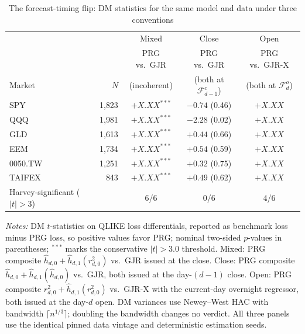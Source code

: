 \documentclass[11pt,a4paper]{article}
\begin{document}
\begin{table}[htbp]
\centering
\caption{The forecast-timing flip: DM statistics for the same model and data under three conventions}
\label{tab:flip}
\small
\begin{tabular}{lrccc}
\toprule
 & & Mixed & Close & Open \\
 & & PRG vs.\ GJR & PRG vs.\ GJR & PRG vs.\ GJR-X \\
Market & $N$ & (incoherent) & (both at $\mathcal{F}^{c}_{d-1}$) & (both at $\mathcal{F}^{o}_{d}$) \\
\midrule
SPY     & 1{,}823 & $+X.XX^{***}$ & $-0.74$ (0.46) & $+X.XX$ \\
QQQ     & 1{,}981 & $+X.XX^{***}$ & $-2.28$ (0.02) & $+X.XX$ \\
GLD     & 1{,}613 & $+X.XX^{***}$ & $+0.44$ (0.66) & $+X.XX$ \\
EEM     & 1{,}734 & $+X.XX^{***}$ & $+0.54$ (0.59) & $+X.XX$ \\
0050.TW & 1{,}251 & $+X.XX^{***}$ & $+0.32$ (0.75) & $+X.XX$ \\
TAIFEX  & 843     & $+X.XX^{***}$ & $+0.49$ (0.62) & $+X.XX$ \\
\midrule
Harvey-significant ($|t|>3$) & & 6/6 & 0/6 & 4/6 \\
\bottomrule
\end{tabular}
\begin{flushleft}
\footnotesize
\emph{Notes:} DM $t$-statistics on QLIKE loss differentials, reported as benchmark loss minus PRG loss, so positive values favor PRG; nominal two-sided $p$-values in parentheses; $^{***}$ marks the conservative $|t|>3.0$ threshold. Mixed: PRG composite $\hat{h}_{d,0} + \hat{h}_{d,1}(r^2_{d,0})$ vs.\ GJR issued at the close. Close: PRG composite $\hat{h}_{d,0} + \hat{h}_{d,1}(\hat{h}_{d,0})$ vs.\ GJR, both issued at the day-$(d-1)$ close. Open: PRG composite $r^2_{d,0} + \hat{h}_{d,1}(r^2_{d,0})$ vs.\ GJR-X with the current-day overnight regressor, both issued at the day-$d$ open. DM variances use Newey--West HAC with bandwidth $\lceil n^{1/3}\rceil$; doubling the bandwidth changes no verdict. All three panels use the identical pinned data vintage and deterministic estimation seeds.
\end{flushleft}
\end{table}
\end{document}
